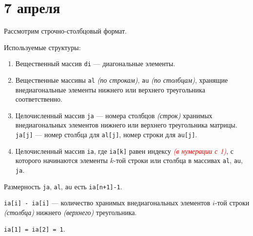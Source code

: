 \chapter{7 апреля}

Рассмотрим строчно-столбцовый формат.

Используемые структуры:
\begin{enumerate}
    \item Вещественный массив \texttt{di} --- диагональные элементы.
    \item Вещественные массивы \texttt{al} \textit{(по строкам)}, \texttt{au} \textit{(по столбцам)}, хранящие внедиагональные элементы нижнего или верхнего треугольника соответственно.
    \item Целочисленный массив \texttt{ja} --- номера столбцов \textit{(строк)} хранимых внедиагональных элементов нижнего или верхнего треугольника матрицы. \texttt{ja[j]} --- номер столбца для \texttt{al[j]}, номер строки для \texttt{au[j]}.
    \item Целочисленный массив \texttt{ia}, где \texttt{ia[k]} равен индексу \textcolor{red}{\textit{(в нумерации с 1)}}, с которого начинаются элементы \(k\)-той строки или столбца в массивах \texttt{al}, \texttt{au}, \texttt{ja}.
\end{enumerate}

Размерность \texttt{ja}, \texttt{al}, \texttt{au} есть \texttt{ia[n+1]-1}.

\texttt{ia[i] - ia[i]} --- количество хранимых внедиагональных элементов \(i\)-той строки \textit{(столбца)} нижнего \textit{(верхнего)} треугольника.

\texttt{ia[1] = ia[2] = 1}.

